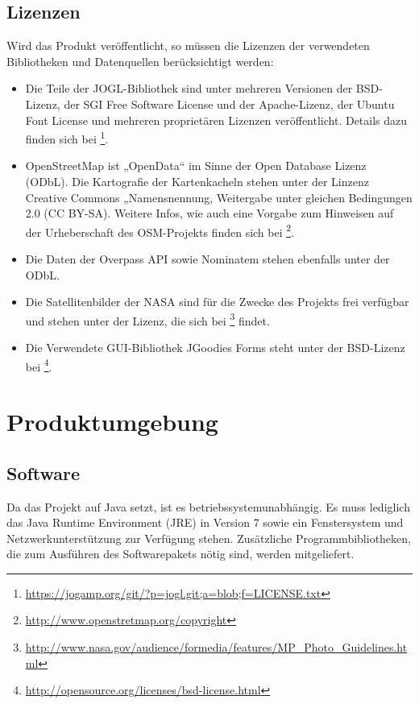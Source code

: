 \documentclass[10pt]{scrreprt}
\begin{document}
\pagebreak
\section{Lizenzen}
Wird das Produkt veröffentlicht, so müssen die Lizenzen der verwendeten Bibliotheken und Datenquellen berücksichtigt werden:
\begin{itemize}
\item Die Teile der JOGL-Bibliothek sind unter mehreren Versionen der BSD-Lizenz, der SGI Free Software License und der Apache-Lizenz, der Ubuntu Font License und mehreren proprietären Lizenzen veröffentlicht. Details dazu finden sich bei  \footnote{\url{https://jogamp.org/git/?p=jogl.git;a=blob;f=LICENSE.txt}}.
\item OpenStreetMap ist „OpenData“ im Sinne der Open Database Lizenz (ODbL). Die Kartografie der Kartenkacheln stehen unter der Linzenz  Creative Commons „Namensnennung, Weitergabe unter gleichen Bedingungen 2.0 (CC BY-SA). Weitere Infos, wie auch eine Vorgabe zum Hinweisen auf der Urheberschaft des OSM-Projekts finden sich bei \footnote{\url{http://www.openstretmap.org/copyright}}.
\item Die Daten der Overpass API sowie Nominatem stehen ebenfalls unter der ODbL.
\item Die Satellitenbilder der NASA sind für die Zwecke des Projekts frei verfügbar und stehen unter der Lizenz, die sich bei \footnote{\url{http://www.nasa.gov/audience/formedia/features/MP_Photo_Guidelines.html}} findet.
\item Die Verwendete GUI-Bibliothek JGoodies Forms steht unter der BSD-Lizenz bei \footnote{\url{http://opensource.org/licenses/bsd-license.html}}.
\end{itemize}




\chapter{Produktumgebung}
\section{Software}
Da das Projekt auf Java setzt, ist es betriebssystemunabhängig. Es muss lediglich das Java Runtime Environment (JRE) in Version 7 sowie ein Fenstersystem und Netzwerkunterstützung zur Verfügung stehen. Zusätzliche Programmbibliotheken, die zum Ausführen des Softwarepakets nötig sind, werden mitgeliefert.\\
\end{document}
